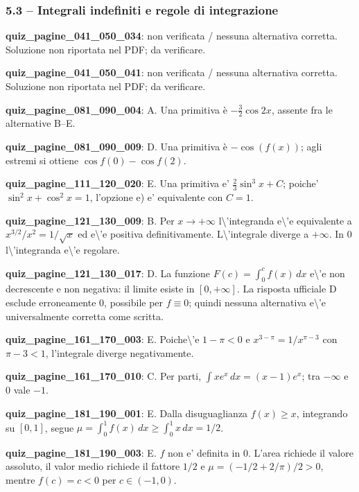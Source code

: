 \documentclass[11pt,a4paper]{article}
\newcounter{quiz}
\begin{document}
\subsubsection*{5.3 -- Integrali indefiniti e regole di integrazione}
\noindent\textbf{quiz\_pagine\_041\_050\_034}: non verificata / nessuna alternativa corretta. Soluzione non riportata nel PDF; da verificare.\par\medskip
\noindent\textbf{quiz\_pagine\_041\_050\_041}: non verificata / nessuna alternativa corretta. Soluzione non riportata nel PDF; da verificare.\par\medskip
\noindent\textbf{quiz\_pagine\_081\_090\_004}: A. Una primitiva è $-\frac32\cos 2x$, assente fra le alternative B--E.\par\medskip
\noindent\textbf{quiz\_pagine\_081\_090\_009}: D. Una primitiva è $-\cos(f(x))$; agli estremi si ottiene $\cos f(0)-\cos f(2)$.\par\medskip
\noindent\textbf{quiz\_pagine\_111\_120\_020}: E. Una primitiva e' $\frac23\sin^3x+C$; poiche' $\sin^2x+\cos^2x=1$, l'opzione e) e' equivalente con $C=1$.\par\medskip
\noindent\textbf{quiz\_pagine\_121\_130\_009}: B. Per $x\to+\infty$ l\textbackslash{}'integranda e\textbackslash{}'e equivalente a $x^{3/2}/x^2=1/\sqrt{x}$ ed e\textbackslash{}'e positiva definitivamente. L\textbackslash{}'integrale diverge a $+\infty$. In $0$ l\textbackslash{}'integranda e\textbackslash{}'e regolare.\par\medskip
\noindent\textbf{quiz\_pagine\_121\_130\_017}: D. La funzione $F(c)=\int_0^c f(x)\,dx$ e\textbackslash{}'e non decrescente e non negativa: il limite esiste in $[0,+\infty]$. La risposta ufficiale D esclude erroneamente $0$, possibile per $f\equiv0$; quindi nessuna alternativa e\textbackslash{}'e universalmente corretta come scritta.\par\medskip
\noindent\textbf{quiz\_pagine\_161\_170\_003}: E. Poiche\textbackslash{}'e $1-\pi<0$ e $x^{3-\pi}=1/x^{\pi-3}$ con $\pi-3<1$, l'integrale diverge negativamente.\par\medskip
\noindent\textbf{quiz\_pagine\_161\_170\_010}: C. Per parti, $\int xe^x\,dx=(x-1)e^x$; tra $-\infty$ e $0$ vale $-1$.\par\medskip
\noindent\textbf{quiz\_pagine\_181\_190\_001}: E. Dalla disuguaglianza $f(x)\geq x$, integrando su $[0,1]$, segue $\mu=\int_0^1f(x)\,dx\geq\int_0^1x\,dx=1/2$.\par\medskip
\noindent\textbf{quiz\_pagine\_181\_190\_003}: E. $f$ non e' definita in $0$. L'area richiede il valore assoluto, il valor medio richiede il fattore $1/2$ e $\mu=(-1/2+2/\pi)/2>0$, mentre $f(c)=c<0$ per $c\in(-1,0)$.\par\medskip
\end{document}
